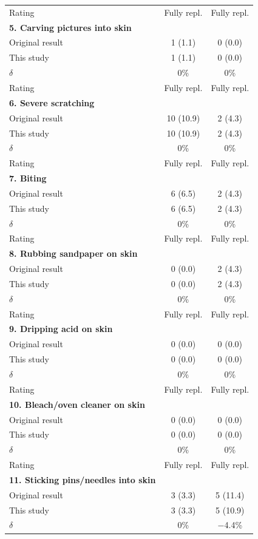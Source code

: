 \documentclass[
  english,
  man,floatsintext]{apa6}
\begin{document}
\begin{center}
\begin{ThreePartTable}
{\begin{longtable}{lcc}
Rating & Fully repl. & Fully repl.\\
\textbf{5. Carving pictures into skin} &  & \\
Original result & 1 (1.1) & 0 (0.0)\\
This study & 1 (1.1) & 0 (0.0)\\
$\delta$ & 0\% & 0\%\\
Rating & Fully repl. & Fully repl.\\
\textbf{6. Severe scratching} &  & \\
Original result & 10 (10.9) & 2 (4.3)\\
This study & 10 (10.9) & 2 (4.3)\\
$\delta$ & 0\% & 0\%\\
Rating & Fully repl. & Fully repl.\\
\textbf{7. Biting} &  & \\
Original result & 6 (6.5) & 2 (4.3)\\
This study & 6 (6.5) & 2 (4.3)\\
$\delta$ & 0\% & 0\%\\
Rating & Fully repl. & Fully repl.\\
\textbf{8. Rubbing sandpaper on skin} &  & \\
Original result & 0 (0.0) & 2 (4.3)\\
This study & 0 (0.0) & 2 (4.3)\\
$\delta$ & 0\% & 0\%\\
Rating & Fully repl. & Fully repl.\\
\textbf{9. Dripping acid on skin} &  & \\
Original result & 0 (0.0) & 0 (0.0)\\
This study & 0 (0.0) & 0 (0.0)\\
$\delta$ & 0\% & 0\%\\
Rating & Fully repl. & Fully repl.\\
\textbf{10. Bleach/oven cleaner on skin} &  & \\
Original result & 0 (0.0) & 0 (0.0)\\
This study & 0 (0.0) & 0 (0.0)\\
$\delta$ & 0\% & 0\%\\
Rating & Fully repl. & Fully repl.\\
\textbf{11. Sticking pins/needles into skin} &  & \\
Original result & 3 (3.3) & 5 (11.4)\\
This study & 3 (3.3) & 5 (10.9)\\
$\delta$ & 0\% & $-$4.4\%\\

\end{longtable}}
\end{ThreePartTable}
\end{center}
\end{document}
